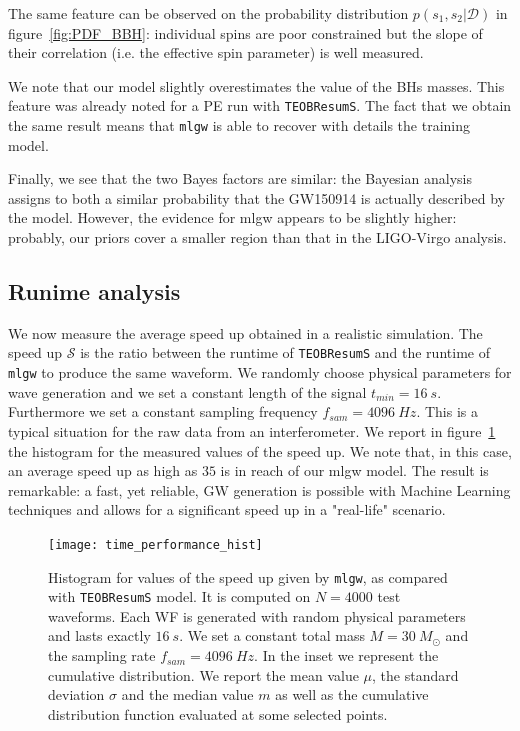 The same feature can be observed on the probability distribution $p(s_1,s_2|\mathcal{D})$ in figure~\ref{fig:PDF_BBH}: individual spins are poor constrained but the slope of their correlation (i.e. the effective spin parameter) is well measured.
\par
We note that our model slightly overestimates the value of the BHs masses. This feature was already noted for a PE run with \texttt{TEOBResumS}. The fact that we obtain the same result means that \texttt{mlgw} is able to recover with details the training model.
\par
Finally, we see that the two Bayes factors are similar: the Bayesian analysis assigns to both a similar probability that the GW150914 is actually described by the model.
However, the evidence for mlgw appears to be slightly higher: probably, our priors cover a smaller region than that in the LIGO-Virgo analysis.
\par
\subsection{Runime analysis}
We now measure the average speed up obtained in a realistic simulation.
The speed up $\mathcal{S}$ is the ratio between the runtime of \texttt{TEOBResumS} and the runtime of \texttt{mlgw} to produce the same waveform.
We randomly choose physical parameters for wave generation and we set a constant length of the signal $t_{min}=\SI{16}{s}$. Furthermore we set a constant sampling frequency $f_{sam} = \SI{4096}{Hz}$. This is a typical situation for the raw data from an interferometer.
We report in figure~\ref{fig:time_performance_hist} the histogram for the measured values of the speed up.
We note that, in this case, an average speed up as high as $35$ is in reach of our mlgw model.
The result is remarkable: a fast, yet reliable, GW generation is possible with Machine Learning techniques and allows for a significant speed up in a "real-life" scenario.

\begin{figure}
	\centering
    \texttt{[image: time\_performance\_hist]}
	\caption{
Histogram for values of the speed up given by \texttt{mlgw}, as compared with \texttt{TEOBResumS} model. It is computed on $N=4000$ test waveforms. Each WF is generated with random physical parameters and lasts exactly $\SI{16}{s}$.
We set a constant total mass $M=\SI{30}{M_\odot}$ and the sampling rate $f_{sam} = \SI{4096}{Hz}$.
In the inset we represent the cumulative distribution.
We report the mean value $\mu$, the standard deviation $\sigma$ and the median value $m$ as well as the cumulative distribution function evaluated at some selected points.
}
	\label{fig:time_performance_hist}
\end{figure}


